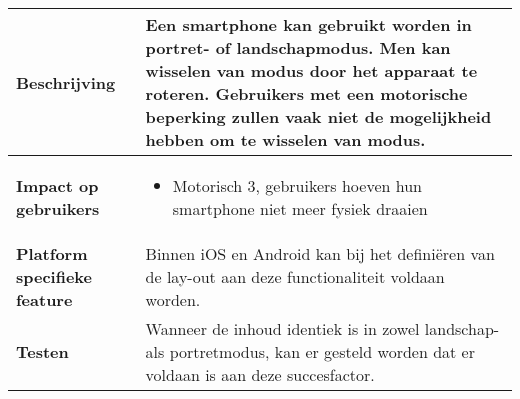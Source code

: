\begin{table}
\begin{tabular}{|l|p{12cm}|}
        \hline
        \textbf{Beschrijving}                 & Een smartphone kan gebruikt worden in portret- of landschapmodus. Men kan wisselen van modus door het apparaat te roteren. Gebruikers met een motorische beperking zullen vaak niet de mogelijkheid hebben om te wisselen van modus. \\ 
        \hline
        \textbf{Impact op gebruikers}         &  
        \begin{itemize}
            \item Motorisch 3, gebruikers hoeven hun smartphone niet meer fysiek draaien
        \end{itemize}                                                                                                                                                                                                                                                                                                                                                                                                                    \\ 
        \hline
        \textbf{Platform specifieke feature}  & Binnen iOS en Android kan bij het definiëren van de lay-out aan deze functionaliteit voldaan worden.                                                                                                                                                                                                                                                                                                                                         \\ 
        \hline
        \textbf{Testen}                       & Wanneer de inhoud identiek is in zowel landschap- als portretmodus, kan er gesteld worden dat er voldaan is aan deze succesfactor.                                                                                                                                                                                                                                                                                                                 \\
        \hline
    \end{tabular}
\end{table}


